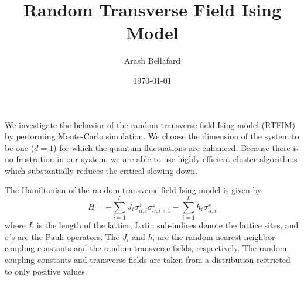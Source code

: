 \documentclass[aps,prl,twocolumn,10pt,notitlepage]{revtex4-1}
\begin{document}
\title{Random Transverse Field Ising Model}

\author{Arash Bellafard}

\date{\today}

\maketitle

We investigate the behavior of the random transverse field Ising model (RTFIM) by performing Monte-Carlo simulation. We choose the dimension of the system to be one ($d = 1$) for which the quantum fluctuations are enhanced. Because there is no frustration in our system, we are able to use highly efficient cluster algorithms which substantially reduces the critical slowing down. 




The Hamiltonian of the random transverse field Ising model is given by
\begin{equation}\label{eq:hamiltonian}
	H = - \sum_{i = 1}^{L} J_{i} \sigma_{\alpha,i}^{z} \sigma_{\alpha,i+1}^{z} - \sum_{i = 1}^{L} h_{i} \sigma_{\alpha,i}^{x}
\end{equation}
where $L$ is the length of the lattice, Latin sub-indices denote the lattice sites, and $\sigma$'s are the Pauli operators. The $J_{i}$ and $h_{i}$ are the random nearest-neighbor coupling constants and the random transverse fields, respectively. The random coupling constants and transverse fields are taken from a distribution restricted to only positive values. 
\end{document}
